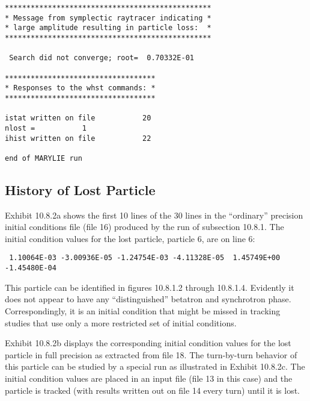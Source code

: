 \begin{footnotesize}
\begin{verbatim}
************************************************
* Message from symplectic raytracer indicating *
* large amplitude resulting in particle loss:  *
************************************************

 Search did not converge; root=  0.70332E-01

***********************************
* Responses to the whst commands: *
***********************************

istat written on file           20
nlost =           1
ihist written on file           22

end of MARYLIE run
\end{verbatim}
\end{footnotesize}

\subsection{History of Lost Particle} 
\label{history}
Exhibit 10.8.2a shows the first 10 lines of the 30 lines in the
``ordinary'' precision initial conditions file (file 16) produced by the
\Mary run of subsection 10.8.1.  The initial condition values for the lost
particle, particle 6, are on line 6:
\begin{footnotesize}
\begin{verbatim}
 1.10064E-03 -3.00936E-05 -1.24754E-03 -4.11328E-05  1.45749E+00 -1.45480E-04
\end{verbatim}
\end{footnotesize}
This particle can be identified in figures 10.8.1.2 through 10.8.1.4.  Evidently it does not
appear to have any ``distinguished'' betatron and synchrotron phase.
Correspondingly, it is an initial condition that might be missed in
tracking studies that use only a more restricted set of initial conditions.

Exhibit 10.8.2b displays the corresponding initial condition values for the lost
particle in full precision as extracted from file 18.  The turn-by-turn
behavior of this particle can be studied by a special \Mary run as
illustrated in Exhibit 10.8.2c.  The initial condition values are placed
in an input file (file 13 in this case) and the particle is tracked (with
results written out on file 14 every turn) until it is lost.

